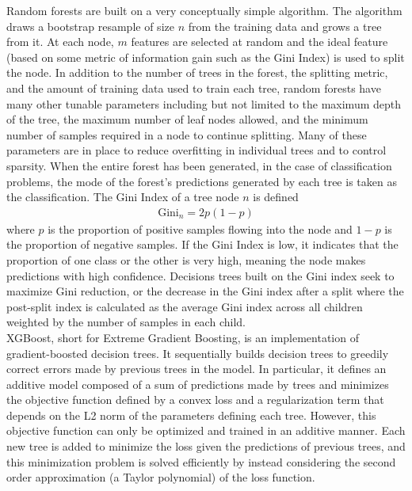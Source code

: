 \documentclass[12pt]{article}
\newtheorem{Proof of Lemma}{Proof of Lemma}
\begin{document}
Random forests are built on a very conceptually simple algorithm. The algorithm draws a bootstrap resample of size $n$ from the training data and grows a tree from it. At each node, $m$ features are selected at random and the ideal feature (based on some metric of information gain such as the Gini Index) is used to split the node. In addition to the number of trees in the forest, the splitting metric, and the amount of training data used to train each tree, random forests have many other tunable parameters including but not limited to the maximum depth of the tree, the maximum number of leaf nodes allowed, and the minimum number of samples required in a node to continue splitting. Many of these parameters are in place to reduce overfitting in individual trees and to control sparsity. When the entire forest has been generated, in the case of classification problems, the mode of the forest's predictions generated by each tree is taken as the classification. The Gini Index of a tree node $n$ is defined
\begin{align}
	\text{Gini}_n = 2p(1-p)
\end{align}
where $p$ is the proportion of positive samples flowing into the node and $1-p$ is the proportion of negative samples. If the Gini Index is low, it indicates that the proportion of one class or the other is very high, meaning the node makes predictions with high confidence. Decisions trees built on the Gini index seek to maximize Gini reduction, or the decrease in the Gini index after a split where the post-split index is calculated as the average Gini index across all children weighted by the number of samples in each child. \\

XGBoost, short for Extreme Gradient Boosting, is an implementation of gradient-boosted decision trees. It sequentially builds decision trees to greedily correct errors made by previous trees in the model. In particular, it defines an additive model composed of a sum of predictions made by trees and minimizes the objective function defined by a convex loss and a regularization term that depends on the L2 norm of the parameters defining each tree. However, this objective function can only be optimized and trained in an additive manner. Each new tree is added to minimize the loss given the predictions of previous trees, and this minimization problem is solved efficiently by instead considering the second order approximation (a Taylor polynomial) of the loss function. \\
\end{document}
